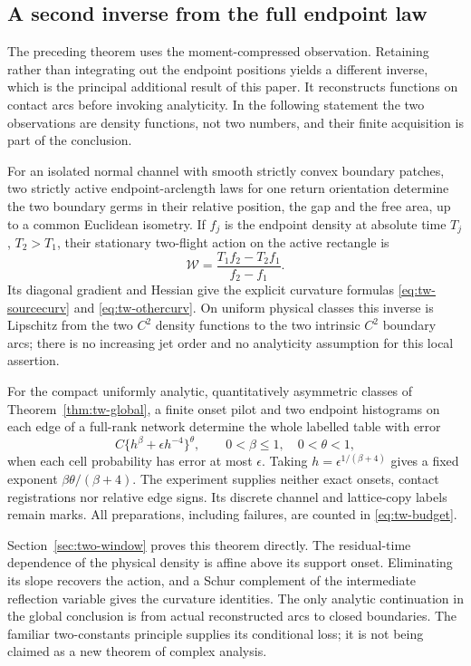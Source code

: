 \subsection{A second inverse from the full endpoint law}
The preceding theorem uses the moment-compressed observation. Retaining
rather than integrating out the endpoint positions yields a different
inverse, which is the principal additional result of this paper.
It reconstructs functions on contact arcs before invoking analyticity.
In the following statement the two observations are density functions,
not two numbers, and their finite acquisition is part of the conclusion.

\begin{theorem}
\label{thm:full-law-main}
For an isolated normal channel with smooth strictly convex boundary
patches, two strictly active endpoint-arclength laws for one return
orientation determine the two boundary germs in their relative position,
the gap and the free area, up to a common Euclidean isometry. If $f_j$
is the endpoint density at absolute time $T_j$, $T_2>T_1$, their
stationary two-flight action on the active rectangle is
\[
 \mathcal W=\frac{T_1f_2-T_2f_1}{f_2-f_1}.
\]
Its diagonal gradient and Hessian give the explicit curvature formulas
\eqref{eq:tw-sourcecurv} and \eqref{eq:tw-othercurv}. On uniform physical
classes this inverse is Lipschitz from the two $C^2$ density functions
to the two intrinsic $C^2$ boundary arcs; there is no increasing jet
order and no analyticity assumption for this local assertion.

For the compact uniformly analytic, quantitatively asymmetric classes
of Theorem~\ref{thm:tw-global}, a finite onset pilot and two endpoint
histograms on each edge of a full-rank network determine the whole
labelled table with error
\[
 C\{h^\beta+\epsilon h^{-4}\}^{\theta},
 \qquad 0<\beta\le1,\quad 0<\theta<1,
\]
when each cell probability has error at most $\epsilon$. Taking
$h=\epsilon^{1/(\beta+4)}$ gives a fixed exponent
$\beta\theta/(\beta+4)$. The experiment supplies neither exact onsets,
contact registrations nor relative edge signs. Its discrete channel
and lattice-copy labels remain marks. All preparations, including
failures, are counted in \eqref{eq:tw-budget}.
\end{theorem}

Section~\ref{sec:two-window} proves this theorem directly. The
residual-time dependence of the physical density is affine above its
support onset. Eliminating its slope recovers the action, and a Schur
complement of the intermediate reflection variable gives the curvature
identities. The only analytic continuation in the global conclusion
is from actual reconstructed arcs to closed boundaries. The familiar
two-constants principle supplies its conditional loss; it is not being
claimed as a new theorem of complex analysis.

